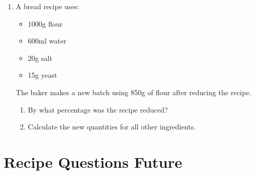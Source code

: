 \documentclass[12pt]{article}
\begin{document}
\begin{enumerate}
\item A bread recipe uses:
    \begin{itemize}
    \item 1000g flour
    \item 600ml water
    \item 20g salt
    \item 15g yeast
    \end{itemize}
    The baker makes a new batch using 850g of flour after reducing the recipe.
    \begin{enumerate}
    \item By what percentage was the recipe reduced?
    \item Calculate the new quantities for all other ingredients.
    \end{enumerate}
\end{enumerate}


\section*{Recipe Questions Future}
\end{document}
